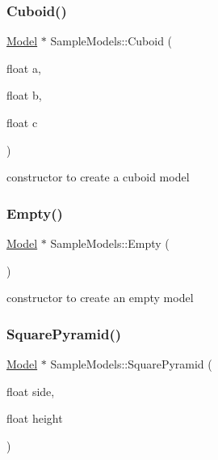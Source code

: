 \mbox{\label{class_sample_models_a5e39e1ad1bcaec4b4ce617332e996caf}} 
\subsubsection{\texorpdfstring{Cuboid()}{Cuboid()}}
{\footnotesize\ttfamily \mbox{\hyperlink{class_model}{Model}} $\ast$ Sample\+Models\+::\+Cuboid (\begin{DoxyParamCaption}\item[{float}]{a,  }\item[{float}]{b,  }\item[{float}]{c }\end{DoxyParamCaption})\hspace{0.3cm}{\ttfamily [static]}}



constructor to create a cuboid model 

\mbox{\label{class_sample_models_a890001f4e859021afe59bd956245e2ad}} 
\subsubsection{\texorpdfstring{Empty()}{Empty()}}
{\footnotesize\ttfamily \mbox{\hyperlink{class_model}{Model}} $\ast$ Sample\+Models\+::\+Empty (\begin{DoxyParamCaption}{ }\end{DoxyParamCaption})\hspace{0.3cm}{\ttfamily [static]}}



constructor to create an empty model 

\mbox{\label{class_sample_models_a0a5afe183db2a5e7e59f825e6ac736e6}} 
\subsubsection{\texorpdfstring{Square\+Pyramid()}{SquarePyramid()}}
{\footnotesize\ttfamily \mbox{\hyperlink{class_model}{Model}} $\ast$ Sample\+Models\+::\+Square\+Pyramid (\begin{DoxyParamCaption}\item[{float}]{side,  }\item[{float}]{height }\end{DoxyParamCaption})\hspace{0.3cm}{\ttfamily [static]}}



